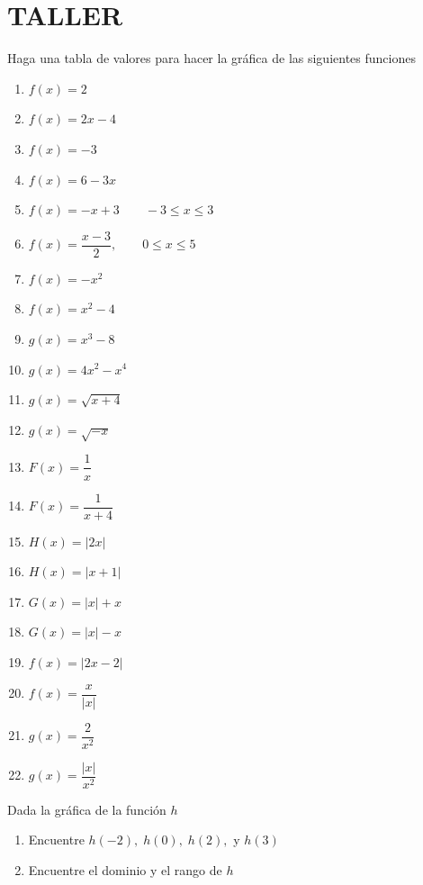 \documentclass[10pt,twoside]{article}
\begin{document}
\section{TALLER}
\begin{enumerate}
  \item Haga una tabla de valores para hacer la gráfica de las siguientes funciones
  \begin{multicols}{2}
    \begin{enumerate}
      \item $ f(x)=2 $ \item $ f(x)=2x-4 $
      \item $ f(x)=-3 $ \item $ f(x)=6-3x $
      \item $ f(x)=-x+3 \qquad -3\leq x\leq 3$ \item $ f(x)=\dfrac{x-3}{2}, \qquad 0\leq x\leq5 $
      \item $ f(x)=-x^2 $ \item $ f(x)=x^2-4 $
      \item $ g(x)=x^3-8 $ \item $ g(x)=4x^2-x^4 $
      \item $ g(x)=\sqrt{x+4} $ \item $ g(x)=\sqrt{-x} $
      \item $ F(x)=\dfrac{1}{x} $ \item $ F(x)=\dfrac{1}{x+4} $
      \item $ H(x)=|2x| $ \item $ H(x)=|x+1| $
      \item $ G(x)=|x|+x $ \item $ G(x)=|x|-x $
      \item $ f(x)=|2x-2| $ \item $ f(x)=\dfrac{x}{|x|} $
      \item $ g(x)=\dfrac{2}{x^2} $ \item $ g(x)=\dfrac{|x|}{x^2} $
    \end{enumerate}
  \end{multicols}
  \begin{minipage}{0.55\textwidth}
  \item Dada la gráfica de la función $ h $
  \begin{enumerate}
    \item Encuentre $ h(-2),\; h(0),\;h(2), $ y $ h(3) $
    \item Encuentre el dominio y el rango de $ h $
  \end{enumerate}    
  \end{minipage}\hfill

\end{enumerate}
\end{document}
